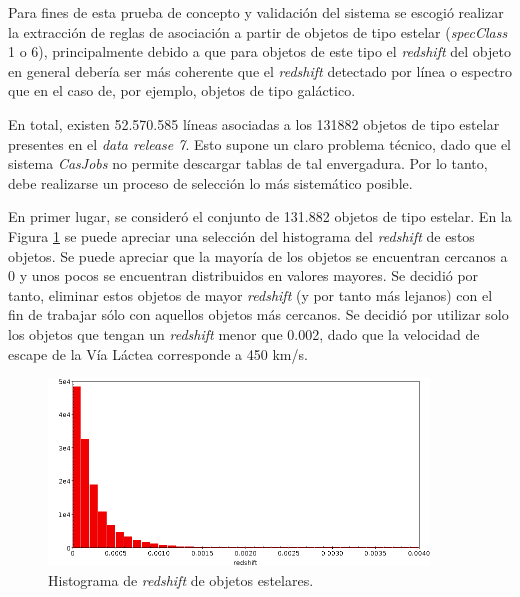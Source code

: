 Para fines de esta prueba de concepto y validación del sistema se escogió realizar la extracción de reglas de asociación a partir de objetos de tipo estelar (\textit{specClass} 1 o 6), principalmente debido a que para objetos de este tipo el \textit{redshift} del objeto en general debería ser más coherente que el \textit{redshift} detectado por línea o espectro que en el caso de, por ejemplo, objetos de tipo galáctico.

En total, existen 52.570.585 líneas asociadas a los 131882 objetos de tipo estelar presentes en el \textit{data release 7}. Esto supone un claro problema técnico, dado que el sistema \textit{CasJobs} no permite descargar tablas de tal envergadura. Por lo tanto, debe realizarse un proceso de selección lo más sistemático posible. 

En primer lugar, se consideró el conjunto de 131.882 objetos de tipo estelar. En la Figura \ref{fig:stelar_obj_redshift} se puede apreciar una selección del histograma del \textit{redshift} de estos objetos. Se puede apreciar que la mayoría de los objetos se encuentran cercanos a 0 y unos pocos se encuentran distribuidos en valores mayores. Se decidió por tanto, eliminar estos objetos de mayor \textit{redshift} (y por tanto más lejanos) con el fin de trabajar sólo con aquellos objetos más cercanos. Se decidió por utilizar solo los objetos que tengan un \textit{redshift} menor que 0.002, dado que la velocidad de escape de la Vía Láctea corresponde a 450 km/s.

\begin{figure}[h!]
\begin{center}
\includegraphics[width=0.9\textwidth]{imagenes/stelar_obj_redshift_hist.png}
\end{center}
\vspace*{-5mm}
\caption{Histograma de \textit{redshift} de objetos estelares.}
\label{fig:stelar_obj_redshift}
\end{figure}


